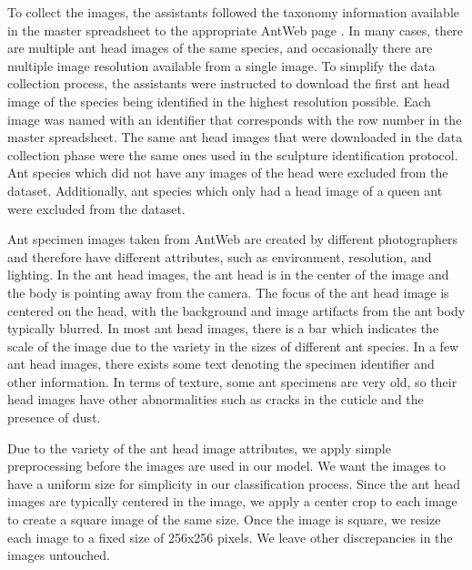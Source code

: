 \documentclass{aci}
\numberwithin{equation}{section}
\begin{document}

To collect the images, the assistants followed the taxonomy information
available in the master spreadsheet to the appropriate AntWeb page
\cite{perrichot_antweb_2012}. In many cases, there are multiple ant head images
of the same species, and occasionally there are multiple image resolution
available from a single image. To simplify the data collection process, the
assistants were instructed to download the first ant head image of the species
being identified in the highest resolution possible. Each image was named with
an identifier that corresponds with the row number in the master spreadsheet.
The same ant head images that were downloaded in the data collection phase were
the same ones used in the sculpture identification protocol. Ant species which
did not have any images of the head were excluded from the dataset.
Additionally, ant species which only had a head image of a queen ant were
excluded from the dataset.

Ant specimen images taken from AntWeb \cite{perrichot_antweb_2012} are created
by different photographers and therefore have different attributes, such as
environment, resolution, and lighting. In the ant head images, the ant head is
in the center of the image and the body is pointing away from the camera. The
focus of the ant head image is centered on the head, with the background and
image artifacts from the ant body typically blurred. In most ant head images,
there is a bar which indicates the scale of the image due to the variety in the
sizes of different ant species. In a few ant head images, there exists some text
denoting the specimen identifier and other information. In terms of texture,
some ant specimens are very old, so their head images have other abnormalities
such as cracks in the cuticle and the presence of dust.


Due to the variety of the ant head image attributes, we apply simple
preprocessing before the images are used in our model. We want the images to
have a uniform size for simplicity in our classification process. Since the ant
head images are typically centered in the image, we apply a center crop to each
image to create a square image of the same size. Once the image is square, we
resize each image to a fixed size of 256x256 pixels. We leave other
discrepancies in the images untouched.
\end{document}
